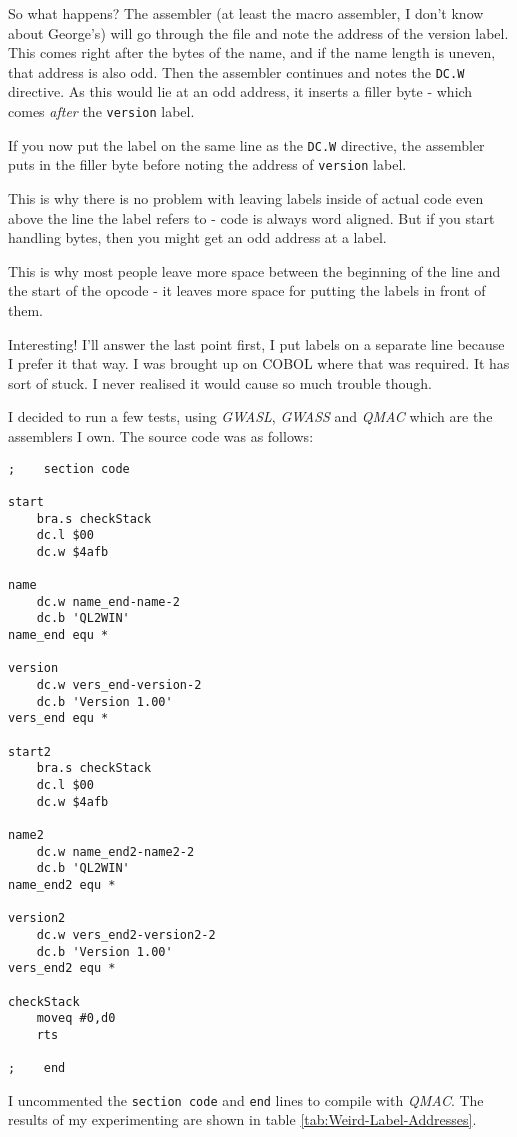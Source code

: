 \begin{itemize}
So what happens? The assembler (at least the macro assembler, I don't
know about George's) will go through the file and note the address
of the version label. This comes right after the bytes of the name,
and if the name length is uneven, that address is also odd. Then the
assembler continues and notes the \texttt{DC.W} directive. As this
would lie at an odd address, it inserts a filler byte - which comes
\emph{after} the \texttt{version} label.

If you now put the label on the same line as the \texttt{DC.W} directive,
the assembler puts in the filler byte before noting the address of
\texttt{version} label.

This is why there is no problem with leaving labels inside of actual
code even above the line the label refers to - code is always word
aligned. But if you start handling bytes, then you might get an odd
address at a label.

This is why most people leave more space between the beginning of
the line and the start of the opcode - it leaves more space for putting
the labels in front of them.
\end{itemize}
Interesting! I'll answer the last point first, I put labels on a separate
line because I prefer it that way. I was brought up on COBOL where
that was required. It has sort of stuck. I never realised it would
cause so much trouble though.

I decided to run a few tests, using \emph{GWASL}, \emph{GWASS} and
\emph{QMAC} which are the assemblers I own. The source code was as
follows:

\begin{lstlisting}
;    section code

start
    bra.s checkStack
    dc.l $00
    dc.w $4afb

name
    dc.w name_end-name-2
    dc.b 'QL2WIN'
name_end equ *

version
    dc.w vers_end-version-2
    dc.b 'Version 1.00'
vers_end equ *

start2
    bra.s checkStack
    dc.l $00
    dc.w $4afb

name2
    dc.w name_end2-name2-2
    dc.b 'QL2WIN'
name_end2 equ *

version2
    dc.w vers_end2-version2-2
    dc.b 'Version 1.00'
vers_end2 equ *

checkStack
    moveq #0,d0
    rts

;    end
\end{lstlisting}

I uncommented the \texttt{section code} and \texttt{end} lines to
compile with \emph{QMAC}. The results of my experimenting are shown
in table \ref{tab:Weird-Label-Addresses}.

